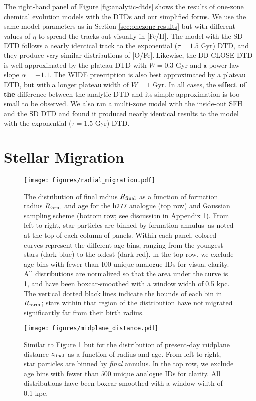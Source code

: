 \documentclass[twocolumn,twocolappendix,linenumbers]{aastex631}
\newcommand{\hydro}{{\tt h277}\xspace}
\begin{document}
The right-hand panel of Figure \ref{fig:analytic-dtds} shows the results of one-zone chemical evolution models with the \citet{Greggio2005-AnalyticalRates} DTDs and our simplified forms. We use the same model parameters as in Section \ref{sec:onezone-results} but with different values of $\eta$ to spread the tracks out visually in [Fe/H]. The model with the SD DTD follows a nearly identical track to the exponential ($\tau=1.5$ Gyr) DTD, and they produce very similar distributions of [O/Fe]. Likewise, the DD CLOSE DTD is well approximated by the plateau DTD with $W=0.3$ Gyr and a power-law slope $\alpha=-1.1$. The WIDE prescription is also best approximated by a plateau DTD, but with a longer plateau width of $W=1$ Gyr. In all cases, the {\bf effect of the} difference between the analytic DTD and its simple approximation is too small to be observed. We also ran a multi-zone model with the inside-out SFH and the \citet{Greggio2005-AnalyticalRates} SD DTD and found it produced nearly identical results to the model with the exponential ($\tau=1.5$ Gyr) DTD.

\section{Stellar Migration}
\label{app:migration}

\begin{figure*}
    \centering
    \texttt{[image: figures/radial\_migration.pdf]}
    \caption{The distribution of final radius $R_{\rm final}$ as a function of formation radius $R_{\rm form}$ and age for the \hydro analogue (top row) and Gaussian sampling scheme (bottom row; see discussion in Appendix \ref{app:migration}). From left to right, star particles are binned by formation annulus, as noted at the top of each column of panels. Within each panel, colored curves represent the different age bins, ranging from the youngest stars (dark blue) to the oldest (dark red). In the top row, we exclude age bins with fewer than 100 unique analogue IDs for visual clarity. All distributions are normalized so that the area under the curve is 1, and have been boxcar-smoothed with a window width of 0.5 kpc. The vertical dotted black lines indicate the bounds of each bin in $R_{\rm form}$; stars within that region of the distribution have not migrated significantly far from their birth radius.}
    \label{fig:radial-migration}
\end{figure*}

\begin{figure*}
    \centering
    \texttt{[image: figures/midplane\_distance.pdf]}
    \caption{Similar to Figure \ref{fig:radial-migration} but for the distribution of present-day midplane distance $z_{\rm final}$ as a function of radius and age. From left to right, star particles are binned by \textit{final} annulus. In the top row, we exclude age bins with fewer than 500 unique analogue IDs for clarity. All distributions have been boxcar-smoothed with a window width of 0.1 kpc.}
    \label{fig:midplane-distance}
\end{figure*}
\end{document}
